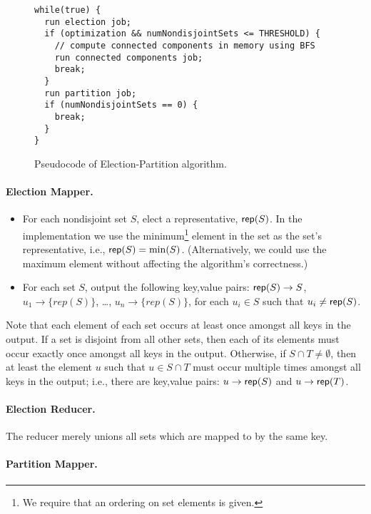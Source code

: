 \documentclass{article}[12pt]
\numberwithin{figure}{section}
\begin{document}
\begin{figure}
\begin{lstlisting}
while(true) {
  run election job;
  if (optimization && numNondisjointSets <= THRESHOLD) {
    // compute connected components in memory using BFS
    run connected components job;
    break;
  }
  run partition job;
  if (numNondisjointSets == 0) {
    break;
  }
}
\end{lstlisting}
\caption{Pseudocode of Election-Partition algorithm.}
\label{fig:election-partition}
\end{figure}

\paragraph{Election Mapper.}  

\begin{itemize}
\item For each nondisjoint set $S$, elect a representative, $\mathsf{rep}(S)$.  In the implementation we use the minimum\footnote{We require that an ordering on set elements is given.} 
element in the set as the set's representative, i.e., $\mathsf{rep}(S) = \min(S)$.  (Alternatively, we could use the maximum element without affecting
the algorithm's correctness.)

\item For each set $S$, output the following key,value pairs: $\mathsf{rep}(S) \to S$, $u_1 \to \{rep(S)\}$, \ldots, $u_n \to \{rep(S)\}$, for each $u_i \in S$ such that
$u_i \neq \mathsf{rep}(S)$.
\end{itemize}

Note that each element of each set occurs at least once amongst all keys in the output.  
If a set is disjoint from all other sets, then each of its elements must occur exactly once amongst all keys in the output.
Otherwise, if $S \cap T \neq \emptyset$, then at least the element $u$ such that $u \in S \cap T$ must occur multiple
times amongst all keys in the output; i.e., there are key,value pairs: $u \to \mathsf{rep}(S)$ and $u \to \mathsf{rep}(T)$.

\paragraph{Election Reducer.}

The reducer merely unions all sets which are mapped to by the same key.

\paragraph{Partition Mapper.}
\end{document}
